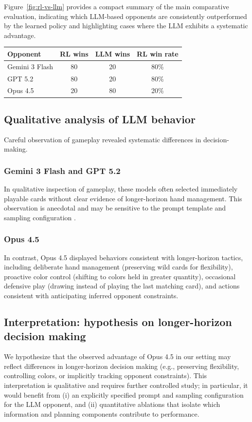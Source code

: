 \documentclass[11pt]{article}
\begin{document}
Figure~\ref{fig:rl-vs-llm} provides a compact summary of the main comparative evaluation, indicating which LLM-based opponents are consistently outperformed by the learned policy and highlighting cases where the LLM exhibits a systematic advantage.

\begin{center}
\begin{tabular}{@{}lccc@{}}
\toprule
Opponent & RL wins & LLM wins & RL win rate \\
\midrule
Gemini 3 Flash & 80 & 20 & 80\% \\
GPT 5.2 & 80 & 20 & 80\% \\
Opus 4.5 & 20 & 80 & 20\% \\
\bottomrule
\end{tabular}
\end{center}

\subsection{Qualitative analysis of LLM behavior}
Careful observation of gameplay revealed systematic differences in decision-making.

\FloatBarrier
\subsubsection{Gemini 3 Flash and GPT 5.2}
In qualitative inspection of gameplay, these models often selected immediately playable cards without clear evidence of longer-horizon hand management. This observation is anecdotal and may be sensitive to the prompt template and sampling configuration \parencite{policyuno_repo}.

\subsubsection{Opus 4.5}
In contrast, Opus 4.5 displayed behaviors consistent with longer-horizon tactics, including deliberate hand management (preserving wild cards for flexibility), proactive color control (shifting to colors held in greater quantity), occasional defensive play (drawing instead of playing the last matching card), and actions consistent with anticipating inferred opponent constraints.

\subsection{Interpretation: hypothesis on longer-horizon decision making}
We hypothesize that the observed advantage of Opus 4.5 in our setting may reflect differences in longer-horizon decision making (e.g., preserving flexibility, controlling colors, or implicitly tracking opponent constraints). This interpretation is qualitative and requires further controlled study; in particular, it would benefit from (i) an explicitly specified prompt and sampling configuration for the LLM opponent, and (ii) quantitative ablations that isolate which information and planning components contribute to performance.
\end{document}
